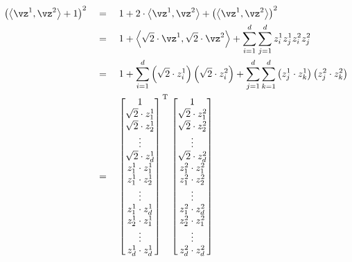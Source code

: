 \documentclass{article}
\begin{document}
\begin{mlsolution}
\begin{addmargin}{1.5em}
		\begin{align*}
			\para{\ip{\vz^1}{\vz^2} + 1}^2	&\eq	1 + 2 \cdot \ip{\vz^1}{\vz^2} + \para{\ip{\vz^1}{\vz^2}}^2 \\
											&\eq	1 + \ip{\sqrt{2} \cdot \vz^1}{\sqrt{2} \cdot \vz^2} + \sum_{i = 1}^d \sum_{j = 1}^d z^1_i z^1_j z^2_i z^2_j \\
											&\eq	1 + \sum_{i = 1}^d \para{\sqrt{2} \cdot z_i^1} \para{\sqrt{2} \cdot z_i^2} + \sum_{j = 1}^d \sum_{k = 1}^d \para{z_j^1 \cdot z_k^1} \para{z_j^2 \cdot z_k^2} \\
											&\eq	\brac{\begin{matrix}
															1					\\
														\sqrt{2} \cdot z_1^1	\\
														\sqrt{2} \cdot z_2^1	\\
														\vdots					\\
														\sqrt{2} \cdot z_d^1	\\
														z_1^1 \cdot z_1^1		\\
														z_1^1 \cdot z_2^1		\\
														\vdots					\\
														z_1^1 \cdot z_d^1		\\
														z_2^1 \cdot z_1^1		\\
														\vdots					\\
														z_d^1 \cdot z_d^1
													\end{matrix}}^{\mt{T}}
													\brac{\begin{matrix}
															1					\\
														\sqrt{2} \cdot z_1^2	\\
														\sqrt{2} \cdot z_2^2	\\
														\vdots					\\
														\sqrt{2} \cdot z_d^2	\\
														z_1^2 \cdot z_1^2		\\
														z_1^2 \cdot z_2^2		\\
														\vdots					\\
														z_1^2 \cdot z_d^2		\\
														z_2^2 \cdot z_1^2		\\
														\vdots					\\
														z_d^2 \cdot z_d^2
													\end{matrix}}
		\end{align*}


\end{addmargin}
\end{mlsolution}
\end{document}
